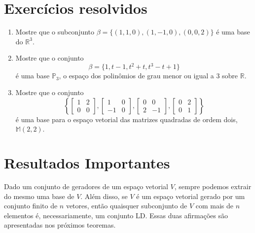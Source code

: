 \section{Exercícios resolvidos}

\begin{enumerate}
	\item Mostre que o subconjunto  $\beta=\{(1,1,0), (1,-1,0), (0,0,2)\}$ é uma base do  $\mathbb{R}^3$.



	\item   Mostre que o conjunto $$\beta= \{1, t-1, t^2+t, t^3-t+1\}$$ é uma base  $\mathbb{P}_3$, o espaço dos polinômios de grau menor  ou igual a 3 sobre $\mathbb{R}$.

	\item Mostre que o conjunto $$\left\{ \begin{bmatrix} 1 & 2 \\ 0 & 0\end{bmatrix}, \begin{bmatrix} 1 &0 \\ -1 & 0\end{bmatrix},\begin{bmatrix}0 & 0 \\ 2 & -1 \end{bmatrix},  \begin{bmatrix}0 & 2 \\ 0 & 1 \end{bmatrix} \right\}$$  é uma base para o espaço vetorial das matrizes quadradas de ordem dois,  $\mathbb{M}(2,2)$.

\end{enumerate}













\section{Resultados Importantes}


Dado um conjunto de geradores de um espaço vetorial $V$, sempre podemos extrair  do mesmo uma base de  $V$. Além disso,  se $V$ é um espaço vetorial  gerado por um conjunto finito de $n$ vetores, então quaisquer subconjunto de $V$ com mais de $n$ elementos é, necessariamente,  um conjunto LD.  Essas duas afirmações são apresentadas nos próximos teoremas.
\vspace{0.3cm}

